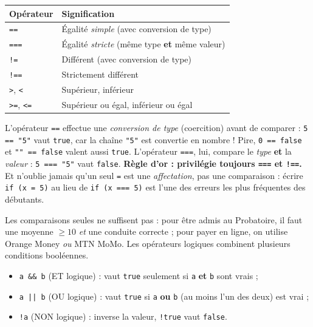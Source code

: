 \documentclass[11pt]{article}
\newcounter{popsec}
\newcounter{popsub}
\newcommand{\courssub}[1]{%
  \stepcounter{popsub}%
  \par\vspace{9pt}\noindent{\popxbold\fontsize{11.5}{13}\selectfont\color{popink}{\color{poporange}\thepopsec.\thepopsub}\hspace{6pt}#1}\par\nopagebreak\vspace{4pt}
}
\begin{document}
\begin{propriete}
\begin{center}
\begin{tabularx}{\linewidth}{|l|X|}
\hline
\rowcolor{popblueL} \textbf{Opérateur} & \textbf{Signification} \\
\hline
\texttt{==} & Égalité \emph{simple} (avec conversion de type) \\
\hline
\texttt{===} & Égalité \emph{stricte} (même type \textbf{et} même valeur) \\
\hline
\texttt{!=} & Différent (avec conversion de type) \\
\hline
\texttt{!==} & Strictement différent \\
\hline
\texttt{>}, \texttt{<} & Supérieur, inférieur \\
\hline
\texttt{>=}, \texttt{<=} & Supérieur ou égal, inférieur ou égal \\
\hline
\end{tabularx}
\end{center}
\end{propriete}

\begin{attention}[\texttt{==} contre \texttt{===} : le piège de la coercition]
L'opérateur \texttt{==} effectue une \emph{conversion de type} (coercition) avant de comparer : \texttt{5 == "5"} vaut \texttt{true}, car la chaîne \texttt{"5"} est convertie en nombre ! Pire, \texttt{0 == false} et \texttt{"" == false} valent aussi \texttt{true}. L'opérateur \texttt{===}, lui, compare le \emph{type} \textbf{et} la \emph{valeur} : \texttt{5 === "5"} vaut \texttt{false}. \textbf{Règle d'or : privilégie toujours \texttt{===} et \texttt{!==}.} Et n'oublie jamais qu'un seul \texttt{=} est une \emph{affectation}, pas une comparaison : écrire \texttt{if (x = 5)} au lieu de \texttt{if (x === 5)} est l'une des erreurs les plus fréquentes des débutants.
\end{attention}

\courssub{Les opérateurs logiques : \texttt{\&\&}, \texttt{||}, \texttt{!}}

Les comparaisons seules ne suffisent pas : pour être admis au Probatoire, il faut une moyenne $\geq 10$ \emph{et} une conduite correcte ; pour payer en ligne, on utilise Orange Money \emph{ou} MTN MoMo. Les opérateurs logiques combinent plusieurs conditions booléennes.

\begin{propriete}
\begin{itemize}
\item \texttt{a \&\& b} (ET logique) : vaut \texttt{true} seulement si \texttt{a} \textbf{et} \texttt{b} sont vrais ;
\item \texttt{a || b} (OU logique) : vaut \texttt{true} si \texttt{a} \textbf{ou} \texttt{b} (au moins l'un des deux) est vrai ;
\item \texttt{!a} (NON logique) : inverse la valeur, \texttt{!true} vaut \texttt{false}.
\end{itemize}
\end{propriete}
\end{document}
